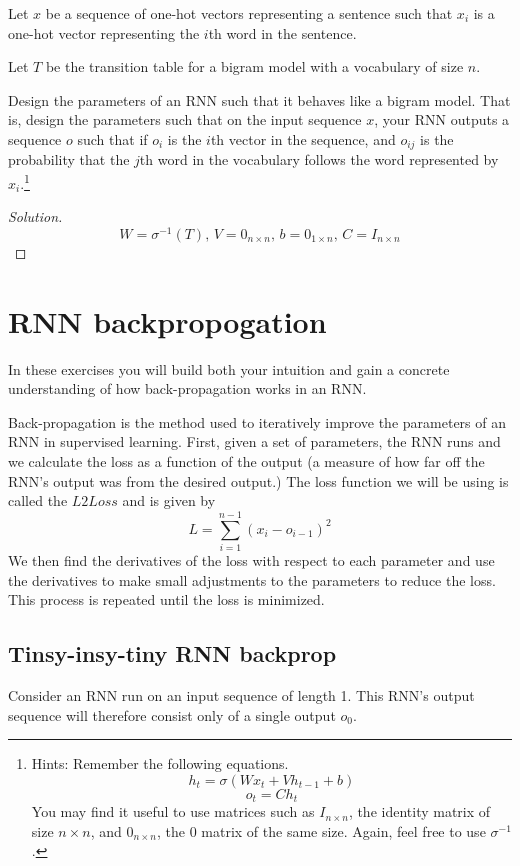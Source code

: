 \documentclass{article}
\begin{document}
Let $x$ be a sequence of one-hot vectors representing a sentence such that $x_i$ is a one-hot vector representing the $i$th word in the sentence.

Let $T$ be the transition table for a bigram model with a vocabulary of size $n$.

Design the parameters of an RNN such that it behaves like a bigram model. That is, design the parameters such that on the input sequence $x$, your RNN outputs a sequence $o$ such that if $o_i$ is the $i$th vector in the sequence, and $o_{ij}$ is the probability that the $j$th word in the vocabulary follows the word represented by $x_i$.\footnote{Hints: Remember the following equations.
$$ h_t = \sigma(Wx_t + Vh_{t - 1} + b) $$
$$ o_t = Ch_t $$
You may find it useful to use matrices such as $I_{n \times n}$, the identity matrix of size $n \times n$, and $0_{n \times n}$, the 0 matrix of the same size. Again, feel free to use $\sigma^{-1}$.}

\begin{proof}[Solution]
    $$ W = \sigma^{-1}(T), \, V = 0_{n \times n}, \, b = 0_{1 \times n}, \, C = I_{n \times n} $$
\end{proof}

\section{RNN backpropogation}
In these exercises you will build both your intuition and gain a concrete understanding of how back-propagation works in an RNN.

Back-propagation is the method used to iteratively improve the parameters of an RNN in supervised learning. First, given a set of parameters, the RNN runs and we calculate the loss as a function of the output (a measure of how far off the RNN's output was from the desired output.) The loss function we will be using is called the $L2Loss$ and is given by
$$ L = \sum_{i = 1}^{n - 1} (x_{i} - o_{i - 1})^2 $$
We then find the derivatives of the loss with respect to each parameter and use the derivatives to make small adjustments to the parameters to reduce the loss. This process is repeated until the loss is minimized.

\subsection{Tinsy-insy-tiny RNN backprop}
Consider an RNN run on an input sequence of length 1. This RNN's output sequence will therefore consist only of a single output $o_0$.
\end{document}
